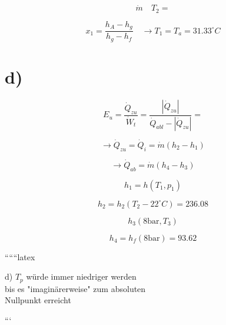\[
\dot{m} \quad T_2 =
\]

\[
x_1 = \frac{h_A - h_g}{h_g - h_f} \quad \rightarrow T_1 = T_a = 31.33^\circ C
\]

\section*{d)}

\[
E_u = \frac{\dot{Q}_{zu}}{\dot{W}_t} = \frac{|\dot{Q}_{zu}|}{\dot{Q}_{abl} - |\dot{Q}_{zu}|} =
\]

\[
\rightarrow \dot{Q}_{zu} = \dot{Q}_i = \dot{m} (h_2 - h_1)
\]

\[
\rightarrow \dot{Q}_{ab} = \dot{m} (h_4 - h_3)
\]

\[
h_1 = h(T_1, p_1)
\]

\[
h_2 = h_2(T_2 - 22^\circ C) = 236.08
\]

\[
h_3 (8 \text{bar}, T_3)
\]

\[
h_4 = h_f (8 \text{bar}) = 93.62
\]

``````latex


d) $T_p$ würde immer niedriger werden \\
bis es "imaginärerweise" zum absoluten \\
Nullpunkt erreicht

```